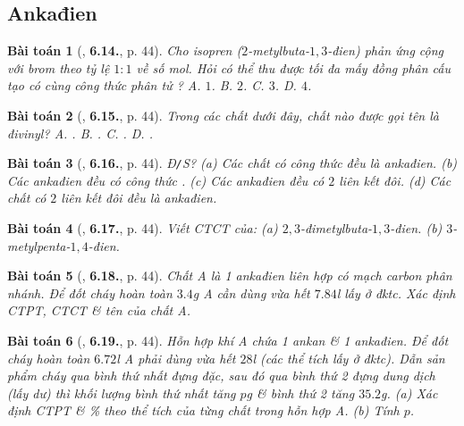 \documentclass{article}
\numberwithin{equation}{section}
\newtheorem{baitoan}{Bài toán}[section]
\begin{document}

\subsection{Ankađien}

\begin{baitoan}[\cite{SBT_Hoa_Hoc_11_co_ban}, \textbf{6.14.}, p. 44]
	Cho isopren ($2$-metylbuta-$1,3$-đien) phản ứng cộng với brom theo tỷ lệ $1:1$ về số mol. Hỏi có thể thu được tối đa mấy đồng phân cấu tạo có cùng công thức phân tử \emph{}? {\sf A.} $1$. {\sf B.} $2$. {\sf C.} $3$. {\sf D.} $4$.
\end{baitoan}

\begin{baitoan}[\cite{SBT_Hoa_Hoc_11_co_ban}, \textbf{6.15.}, p. 44]
	Trong các chất dưới đây, chất nào được gọi tên là \emph{đivinyl}? {\sf A.} \emph{}. {\sf B.} \emph{}. {\sf C.} \emph{}. {\sf D.} \emph{}.
\end{baitoan}

\begin{baitoan}[\cite{SBT_Hoa_Hoc_11_co_ban}, \textbf{6.16.}, p. 44]
	\emph{Đ\texttt{/}S?} (a) Các chất có công thức \emph{} đều là ankađien. (b) Các ankađien đều có công thức \emph{}. (c) Các ankađien đều có $2$ liên kết đôi. (d) Các chất có $2$ liên kết đôi đều là ankađien.
\end{baitoan}

\begin{baitoan}[\cite{SBT_Hoa_Hoc_11_co_ban}, \textbf{6.17.}, p. 44]
	Viết CTCT của: (a) $2,3$-đimetylbuta-$1,3$-đien. (b) $3$-metylpenta-$1,4$-đien.
\end{baitoan}

\begin{baitoan}[\cite{SBT_Hoa_Hoc_11_co_ban}, \textbf{6.18.}, p. 44]
	Chất A là 1 ankađien liên hợp có mạch carbon phân nhánh. Để đốt cháy hoàn toàn $3.4$\emph{g} A cần dùng vừa hết $7.84$\emph{l} \emph{} lấy ở đktc. Xác định CTPT, CTCT \& tên của chất A.
\end{baitoan}

\begin{baitoan}[\cite{SBT_Hoa_Hoc_11_co_ban}, \textbf{6.19.}, p. 44]
	Hỗn hợp khí A chứa 1 ankan \& 1 ankađien. Để đốt cháy hoàn toàn $6.72$\emph{l} A phải dùng vừa hết $28$\emph{l} \emph{} (các thể tích lấy ở đktc). Dẫn sản phẩm cháy qua bình thứ nhất đựng \emph{} đặc, sau đó qua bình thứ 2 đựng dung dịch \emph{} (lấy dư) thì khối lượng bình thứ nhất tăng $p$\emph{g} \& bình thứ 2 tăng $35.2$\emph{g}. (a) Xác định CTPT \& \% theo thể tích của từng chất trong hỗn hợp A. (b) Tính $p$.
\end{baitoan}
\end{document}
